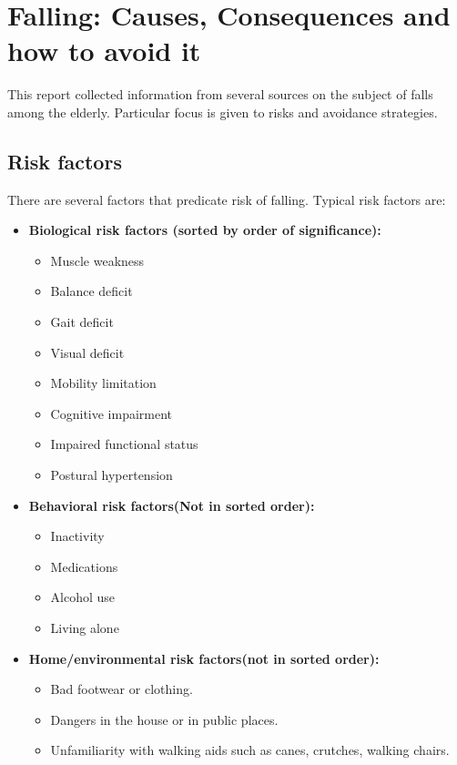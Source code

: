 \section{Falling: Causes, Consequences and how to avoid it}
This report collected information from several sources on the subject of falls among the elderly. Particular focus is given to risks and avoidance strategies.

\subsection{Risk factors}
There are several factors that predicate risk of falling. Typical risk factors are:
\begin{itemize}
\item 
\textbf{Biological risk factors (sorted by order of significance):  \cite{fallsRubenstein}}
\begin{itemize}
\item Muscle weakness
\item Balance deficit
\item Gait deficit
\item Visual deficit
\item Mobility limitation
\item Cognitive impairment
\item Impaired functional status
\item Postural hypertension
\end{itemize}
\item 
\textbf{Behavioral risk factors(Not in sorted order):}
\begin{itemize}
\item Inactivity \cite{cdcComProg}
\item Medications \cite{cdcComProg}
\item Alcohol use \cite{cdcComProg}
\item Living alone \cite{housing}
\end{itemize}
\item 
\textbf{Home/environmental risk factors(not in sorted order): \cite{WHO}}
\begin{itemize}
\item Bad footwear or clothing.
\item Dangers in the house or in public places.
\item Unfamiliarity with walking aids such as canes, crutches, walking chairs.
\end{itemize}
\end{itemize}

